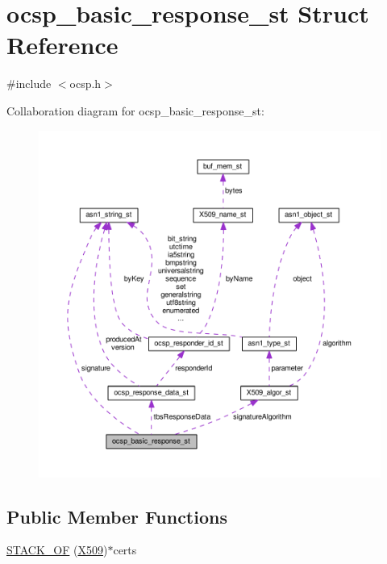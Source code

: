 \hypertarget{structocsp__basic__response__st}{}\section{ocsp\+\_\+basic\+\_\+response\+\_\+st Struct Reference}
\label{structocsp__basic__response__st}


{\ttfamily \#include $<$ocsp.\+h$>$}



Collaboration diagram for ocsp\+\_\+basic\+\_\+response\+\_\+st\+:
\nopagebreak
\begin{figure}[H]
\begin{center}
\leavevmode
\includegraphics[width=350pt]{structocsp__basic__response__st__coll__graph}
\end{center}
\end{figure}
\subsection*{Public Member Functions}
\begin{DoxyCompactItemize}
\item 
\hyperlink{structocsp__basic__response__st_af487e2c8bcee7ce6d8ace295f89e8e9a}{S\+T\+A\+C\+K\+\_\+\+OF} (\hyperlink{ossl__typ_8h_a4f666bde6518f95deb3050c54b408416}{X509})$\ast$certs
\end{DoxyCompactItemize}
